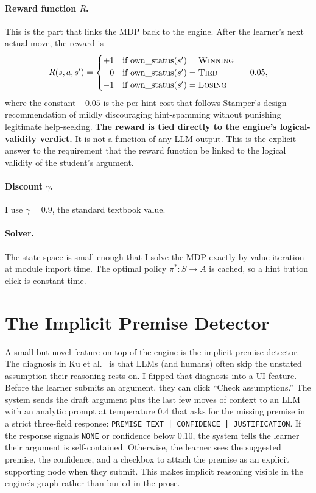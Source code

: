 \paragraph{Reward function $R$.} This is the part that links the MDP back to the engine. After the learner's next actual move, the reward is
\[
R(s, a, s') = \begin{cases}
   +1 & \text{if } \text{own\_status}(s') = \textsc{Winning} \\
   \phantom{+}0 & \text{if } \text{own\_status}(s') = \textsc{Tied} \\
   -1 & \text{if } \text{own\_status}(s') = \textsc{Losing}
\end{cases}
\;-\; 0.05,
\]
where the constant $-0.05$ is the per-hint cost that follows Stamper's design recommendation of mildly discouraging hint-spamming without punishing legitimate help-seeking. \textbf{The reward is tied directly to the engine's logical-validity verdict.} It is not a function of any LLM output. This is the explicit answer to the requirement that the reward function be linked to the logical validity of the student's argument.

\paragraph{Discount $\gamma$.} I use $\gamma = 0.9$, the standard textbook value.

\paragraph{Solver.} The state space is small enough that I solve the MDP exactly by value iteration at module import time. The optimal policy $\pi^*: S \rightarrow A$ is cached, so a hint button click is constant time.

\section{The Implicit Premise Detector}
\label{sec:premise}
A small but novel feature on top of the engine is the implicit-premise detector. The diagnosis in Ku et al.~\cite{ku2025multiagent} is that LLMs (and humans) often skip the unstated assumption their reasoning rests on. I flipped that diagnosis into a UI feature. Before the learner submits an argument, they can click ``Check assumptions.'' The system sends the draft argument plus the last few moves of context to an LLM with an analytic prompt at temperature $0.4$ that asks for the missing premise in a strict three-field response: \texttt{PREMISE\_TEXT | CONFIDENCE | JUSTIFICATION}. If the response signals \texttt{NONE} or confidence below 0.10, the system tells the learner their argument is self-contained. Otherwise, the learner sees the suggested premise, the confidence, and a checkbox to attach the premise as an explicit supporting node when they submit. This makes implicit reasoning visible in the engine's graph rather than buried in the prose.

